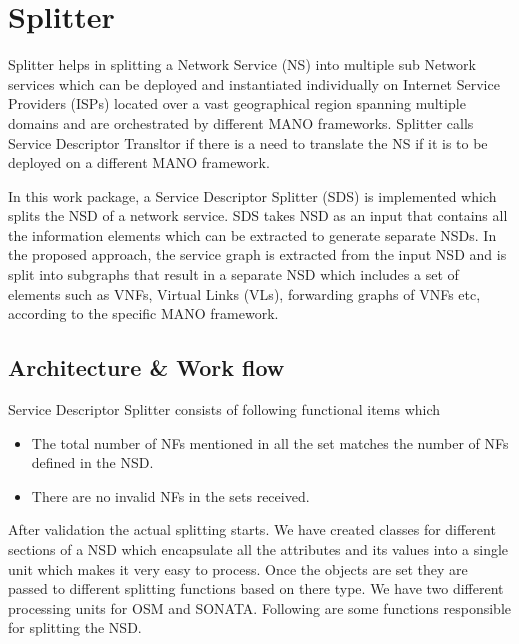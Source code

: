 \newpage

\section{Splitter}
Splitter helps in splitting a Network Service (NS) into multiple sub Network services which can be deployed and instantiated individually on Internet Service Providers (ISPs) located over a vast geographical region spanning multiple domains and are orchestrated by different MANO frameworks. Splitter calls Service Descriptor Transltor if there is a need to translate the NS if it is to be deployed on a different MANO framework.

In this work package, a Service Descriptor Splitter (SDS) is implemented which splits the NSD of a network service. SDS takes
NSD as an input that contains all the information elements which can be extracted to generate separate NSDs. In the proposed approach, the service graph is extracted from the input NSD
and is split into subgraphs that result in a separate NSD which includes a set of elements such as VNFs, Virtual Links (VLs), forwarding graphs of VNFs etc, according to the specific MANO
framework.
\subsection{Architecture \& Work flow}
Service Descriptor Splitter consists of following functional items which 
\begin{itemize}
	\item The total number of NFs mentioned in all the set matches the number of NFs defined in the NSD.
	\item There are no invalid NFs in the sets received.
\end{itemize}

After validation the actual splitting starts. We have created classes for different sections of a NSD which encapsulate all the attributes and its values into a single unit which makes it very easy to process. Once the objects are set they are passed to different splitting functions based on there type. We have two different processing units for OSM and SONATA. Following are some functions responsible for splitting the NSD.

